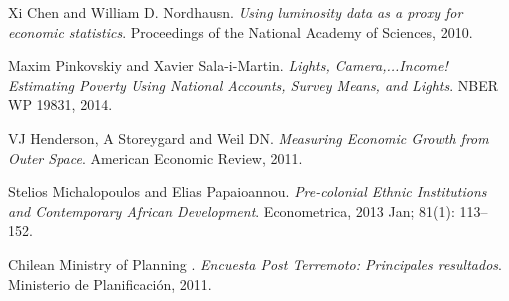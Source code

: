 \documentclass{beamer}
\begin{document}

\begin{thebibliography}{9}
	Xi Chen and William D. Nordhausn. 
	\textit{Using luminosity data as a proxy for economic statistics}. 
	Proceedings of the National Academy of Sciences, 2010.

	Maxim Pinkovskiy and Xavier Sala-i-Martin. 
	\textit{Lights, Camera,...Income! Estimating Poverty Using National Accounts, Survey Means, and Lights}. 
	NBER WP 19831, 2014.

	VJ Henderson, A Storeygard and Weil DN. 
	\textit{Measuring Economic Growth from Outer Space}. 
	American Economic Review, 2011.

	Stelios Michalopoulos and Elias Papaioannou. 
	\textit{Pre-colonial Ethnic Institutions and Contemporary African Development}. 
	Econometrica, 2013 Jan; 81(1): 113–152.

	Chilean Ministry of Planning . 
	\textit{Encuesta Post Terremoto: Principales resultados}. 
	Ministerio de Planificación, 2011.
\end{thebibliography}
\end{document}
